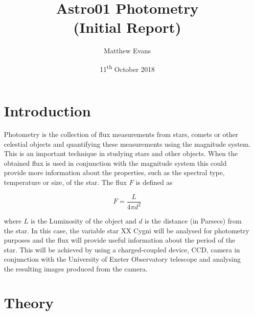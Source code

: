 \documentclass{article}
\begin{document}
\title{Astro01 Photometry \\ \large{(Initial Report)}} %
\author{Matthew Evans}%
\date{11\textsuperscript{th} October 2018} %
\maketitle %




\section{Introduction}
\label{sec:introduction}

Photometry is the collection of flux measurements from stars, comets or other celestial objects and quantifying these measurements using the magnitude system. This is an important technique in studying stars and other objects. When the obtained flux is used in conjunction with the magnitude system this could provide more information about the properties, such as the spectral type, temperature or size, of the star. The flux $F$ is defined as

\begin{equation}
\label{eq:flux}
F = \frac{L}{4\pi d^2} 
\end{equation}

\vspace{2mm}
\noindent
where $L$ is the Luminosity of the object and $d$ is the distance (in Parsecs) from the star. In this case, the variable star XX Cygni \cite{Paper02} will be analysed for photometry purposes and the flux will provide useful information about the period of the star. This will be achieved by using a charged-coupled device, CCD, camera in conjunction with the University of Exeter Observatory telescope \cite{Paper01} and analysing the resulting images produced from the camera. 


\section{Theory}
\label{sec:theory}
\end{document}
